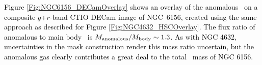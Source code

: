 \documentclass[fleqn,usenatbib]{mnras}
\newcommand{\hi}{\text{H\,\sc{i}}}
\newcommand{\KS}[1]{\textcolor{black}{#1}}
\begin{document}
\textcolor{black}{Figure \ref{Fig:NGC6156_DECamOverlay} shows an overlay of the anomalous \hi\ on a composite $g$+$r$-band CTIO DECam image of NGC~6156\textcolor{black}{, created using the same approach as described %
for Figure \ref{Fig:NGC4632_HSCOverlay}.} The flux ratio of anomalous to main body \hi\ is $M_{\rm{anomalous}}/M_{\rm{body}} \sim 1.3$.  As with NGC 4632, uncertainties in the mask construction \KS{render this mass ratio uncertain}, but the anomalous gas clearly contributes a great deal to the total \hi\ mass of NGC 6156.
}







\end{document}
